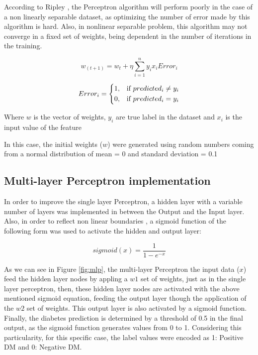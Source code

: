 \documentclass[10pt,twocolumn,letterpaper]{article}
\begin{document}
According to Ripley \cite{Ripley1996}, the Perceptron algorithm will perform poorly in the case of a non linearly separable dataset, as optimizing the number of error made by this algorithm is hard. Also, in nonlinear separable problem, this algorithm may not converge in a fixed set of weights, being dependent in the number of iterations in the training.  

\begin{equation}
	w_(t+1) = w_t + \eta \sum_{i=1}^{n} y_i x_i Error_i
\end{equation}

\begin{equation}
Error_i= 
\begin{dcases}
1,& \text{if } predicted_i \neq y_i\\
0,& \text{if } predicted_i = y_i\\
\end{dcases}
\end{equation}

Where $w$ is the vector of weights, $y_i$ are true label in the dataset and $x_i$ is the input value of the feature

In this case, the initial weights ($w$) were generated using random numbers coming from a normal distribution of mean = 0 and standard deviation = 0.1

\subsection{Multi-layer Perceptron implementation}

In order to improve the single layer Perceptron, a hidden layer with a variable number of layers  was implemented in between the Output and the Input layer. Also, in order to reflect non linear boundaries \cite{Vapnik1995}, a sigmoid function of the following form was used to activate the hidden and output layer:

\begin{equation}
sigmoid(x) = \frac{1}{1-e^{-x}}
\end{equation}

As we can see in Figure \ref{fig:mlp}, the multi-layer Perceptron the input data ($x$) feed the hidden layer nodes by appling a $w1$ set of weights, just as in the single layer perceptron, then, these hidden layer nodes are activated with the above mentioned sigmoid equation, feeding the output layer though the application of the $w2$ set of weights. This output layer is also activated by a sigmoid function. Finally, the diabetes prediction is determined by a threshold of 0.5 in the final output, as the sigmoid function generates values from 0 to 1. Considering this particularity, for this specific case, the label values were encoded as 1: Positive DM and 0: Negative DM.
\end{document}
